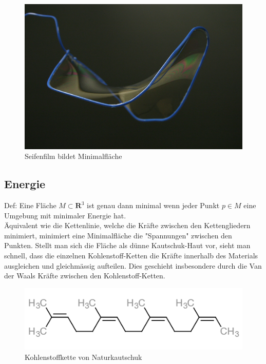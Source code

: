 \begin{refsection}
\begin{figure}[H]
  \centering
  \includegraphics[scale=0.6]{minimal/SoapFilm.jpg}
  \caption{Seifenfilm bildet Minimalfläche} 
\end{figure}

\subsection{Energie}
Def: Eine Fläche $M \subset \mathbf{R}^{3}$ ist genau dann minimal wenn jeder Punkt $p \in M$ eine Umgebung mit minimaler Energie hat.\\
Äquivalent wie die Kettenlinie, welche die Kräfte zwischen den Kettengliedern minimiert, minimiert eine Minimalfläche die "Spannungen" zwischen den Punkten. Stellt man sich die Fläche als dünne Kautschuk-Haut vor, sieht man schnell, dass die einzelnen Kohlenstoff-Ketten die Kräfte innerhalb des Materials ausgleichen und gleichmässig aufteilen. Dies geschieht insbesondere durch die Van der Waals Kräfte zwischen den Kohlenstoff-Ketten.

\begin{figure}[H]
  \centering
  \includegraphics[scale=0.7]{minimal/cis-Polyisopren.PNG}
  \caption{Kohlenstoffkette von Naturkautschuk} 
\end{figure}



\end{refsection}
